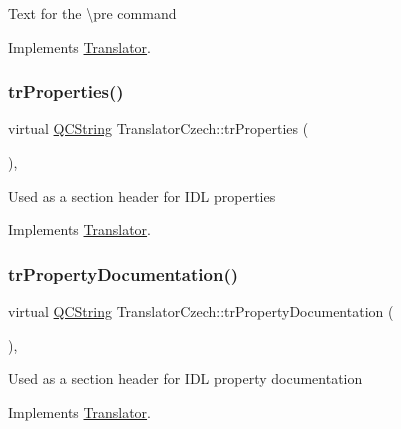 Text for the \textbackslash{}pre command 

Implements \mbox{\hyperlink{class_translator}{Translator}}.

\mbox{\label{class_translator_czech_a9d557f14ba97f8ea4de97e7f88b9c1a0}} 
\subsubsection{\texorpdfstring{trProperties()}{trProperties()}}
{\footnotesize\ttfamily virtual \mbox{\hyperlink{class_q_c_string}{Q\+C\+String}} Translator\+Czech\+::tr\+Properties (\begin{DoxyParamCaption}{ }\end{DoxyParamCaption})\hspace{0.3cm}{\ttfamily [inline]}, {\ttfamily [virtual]}}

Used as a section header for I\+DL properties 

Implements \mbox{\hyperlink{class_translator}{Translator}}.

\mbox{\label{class_translator_czech_a684cbb1a875e13dcbcd7f88f9c96e44e}} 
\subsubsection{\texorpdfstring{trPropertyDocumentation()}{trPropertyDocumentation()}}
{\footnotesize\ttfamily virtual \mbox{\hyperlink{class_q_c_string}{Q\+C\+String}} Translator\+Czech\+::tr\+Property\+Documentation (\begin{DoxyParamCaption}{ }\end{DoxyParamCaption})\hspace{0.3cm}{\ttfamily [inline]}, {\ttfamily [virtual]}}

Used as a section header for I\+DL property documentation 

Implements \mbox{\hyperlink{class_translator}{Translator}}.

\mbox{\label{class_translator_czech_a46c6132e9e24796f3443864f8ab883dc}} 
